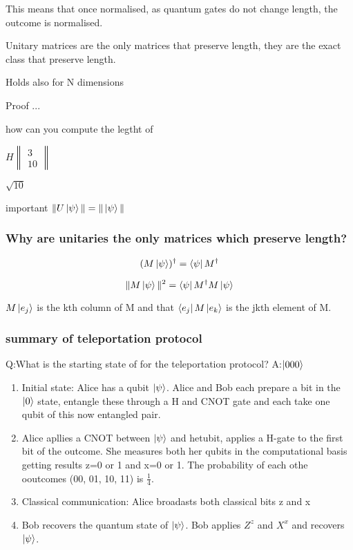\documentclass[a4paper, addpoints, 12pt
    , noanswers    %
    ]{exam}
\begin{document}
\begin{questions}
This means that once normalised, as quantum gates do not change length, the outcome is normalised.

Unitary matrices are the only matrices that preserve length, they are the exact class that preserve length.

Holds also for N dimensions

Proof ...

how can you compute the legtht of 



$H\begin{Vmatrix}
3 \\
10 
\end{Vmatrix}
$

$\sqrt{10}$
 
important 
 $\|U\ket{\psi}\| = \|\ket{\psi}\|$
 
\subsubsection*{Why are unitaries the only matrices which preserve length?}
 
 
$$(M\ket{\psi})^\dagger = \bra{\psi}M^\dagger$$ 


$$\|M\ket{\psi}\|^2 = \bra{\psi}M^\dagger M \ket{\psi}$$


$M\ket{e_j}$ is the kth column of M and that $\bra{e_j}M\ket{e_k}$ is the jkth element of M.





\subsubsection*{summary of teleportation protocol}

Q:What is the starting state of for the teleportation protocol?
A:$\ket{000}$

\begin{enumerate}
\item Initial state: Alice has a qubit $\ket{\psi}$. Alice and Bob each prepare a bit in the $\ket{0}$ state, entangle these through a H and CNOT gate and each take one qubit of this now entangled pair.
\item Alice apllies a CNOT between $\ket{\psi}$ and hetubit, applies a H-gate to the first bit of the outcome. She measures both her qubits in the computational basis getting results z=0 or 1 and x=0 or 1. The probability of each othe ooutcomes (00, 01, 10, 11) is $\tfrac{1}{4}$. 
\item Classical communication: Alice broadasts both classical bits z and x
\item Bob recovers the quantum state of $\ket{\psi}$. Bob applies $Z^z$ and $X^x$ and recovers $\ket{\psi}$.
\end{enumerate}


\end{questions}
\end{document}
